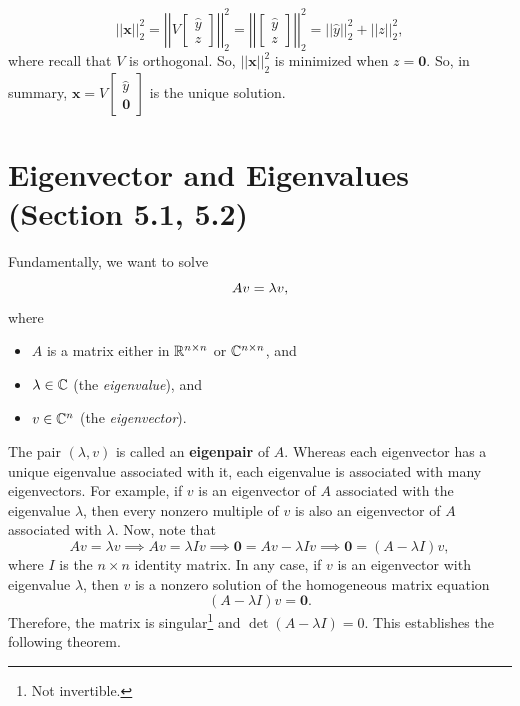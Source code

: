 \documentclass[letterpaper]{article}
\newcommand{\0}{\mathbf{0}}
\newcommand{\x}{\mathbf{x}}
\begin{document}
\[||\x||_2^2 = \left|\left|V \begin{bmatrix}
    \hat{y} \\ z
\end{bmatrix}\right|\right|_2^2 = \left|\left|\begin{bmatrix}
    \hat{y} \\ 
    z
\end{bmatrix}\right|\right|_2^2 = ||\hat{y}||_2^2 + ||z||_2^2,\] where recall that $V$ is orthogonal. So, $||\x||_2^2$ is minimized when $z = \0$. So, in summary, $\boxed{\x = V\begin{bmatrix}
    \hat{y} \\ \0
\end{bmatrix}}$ is the unique solution.







\section{Eigenvector and Eigenvalues (Section 5.1, 5.2)}
Fundamentally, we want to solve \begin{equation}{\label{eq:2-27:1}}
    Av = \lambda v,
\end{equation} where
\begin{itemize}
    \item $A$ is a matrix either in $\mathbb{R}^{n \times n}$ or $\mathbb{C}^{n \times n}$, and 
    \item $\lambda \in \mathbb{C}$ (the \emph{eigenvalue}), and 
    \item $v \in \mathbb{C}^n$ (the \emph{eigenvector}).
\end{itemize}
The pair $(\lambda, v)$ is called an \textbf{eigenpair} of $A$. Whereas each eigenvector has a unique eigenvalue associated with it, each eigenvalue is associated with many eigenvectors. For example, if $v$ is an eigenvector of $A$ associated with the eigenvalue $\lambda$, then every nonzero multiple of $v$ is also an eigenvector of $A$ associated with $\lambda$. Now, note that 
\[Av = \lambda v \implies Av = \lambda I v \implies \0 = Av - \lambda I v \implies  \0 = (A - \lambda I)v,\]
where $I$ is the $n \times n$ identity matrix. In any case, if $v$ is an eigenvector with eigenvalue $\lambda$, then $v$ is a nonzero solution of the homogeneous matrix equation \[(A - \lambda I)v = \0.\] Therefore, the matrix is singular\footnote{Not invertible.} and $\det(A - \lambda I) = 0$. This establishes the following theorem. 
\end{document}
